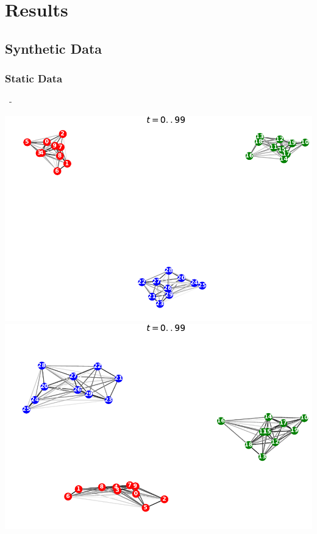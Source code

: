 \documentclass{beamer}
\newenvironment{xframe}
    {\begin{frame}{
        \ifx\insertsubsection\empty
            \strut
        \else\ifx\insertsubsubsection\empty
            \insertsection
        \else
            \insertsection~-~\insertsubsection
        \fi\fi
    }{
        \ifx\insertsubsection\empty
            \insertsection
        \else\ifx\insertsubsubsection\empty
            \insertsubsection
        \else
            \insertsubsubsection
        \fi\fi
    }}
    {\end{frame}}
\begin{document}
\section{Results}

    \subsection{Synthetic Data}
    
    \subsubsection{Static Data}
    
    \begin{xframe}
        \xdouble
            {\includegraphics[width=\textwidth]{contents/figures/Results/Static/Proba/StaticModel-AR(1)-Undirected-True}}
            {\includegraphics[width=\textwidth]{contents/figures/Results/Static/Proba/StaticModel-AR(1)-Undirected-NoLoss}}
    \end{xframe}
    
\end{document}
